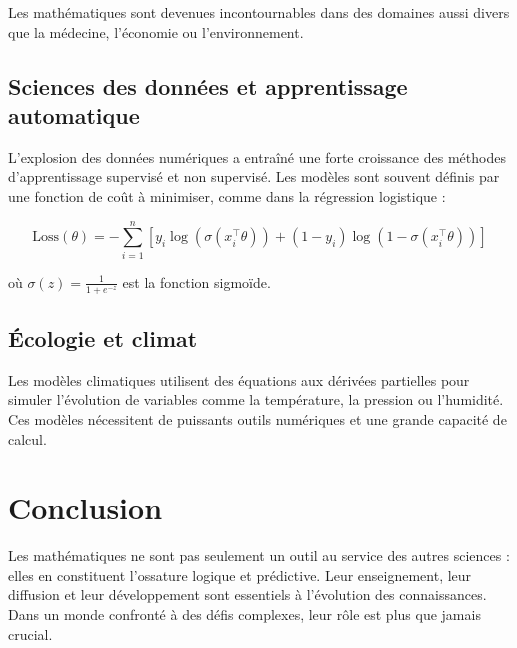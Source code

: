 \documentclass[11pt,a4paper]{article}
\begin{document}
Les mathématiques sont devenues incontournables dans des domaines aussi divers que la médecine, l’économie ou l’environnement.

\subsection*{Sciences des données et apprentissage automatique}

L’explosion des données numériques a entraîné une forte croissance des méthodes d’apprentissage supervisé et non supervisé. Les modèles sont souvent définis par une fonction de coût à minimiser, comme dans la régression logistique :

\begin{equation}
\text{Loss}(\theta) = -\sum_{i=1}^n \left[y_i \log(\sigma(x_i^\top \theta)) + (1 - y_i) \log(1 - \sigma(x_i^\top \theta))\right]
\end{equation}

où $\sigma(z) = \frac{1}{1 + e^{-z}}$ est la fonction sigmoïde.

\subsection*{Écologie et climat}

Les modèles climatiques utilisent des équations aux dérivées partielles pour simuler l’évolution de variables comme la température, la pression ou l’humidité. Ces modèles nécessitent de puissants outils numériques et une grande capacité de calcul.

\section*{Conclusion}

Les mathématiques ne sont pas seulement un outil au service des autres sciences : elles en constituent l’ossature logique et prédictive. Leur enseignement, leur diffusion et leur développement sont essentiels à l’évolution des connaissances. Dans un monde confronté à des défis complexes, leur rôle est plus que jamais crucial.
\end{document}
